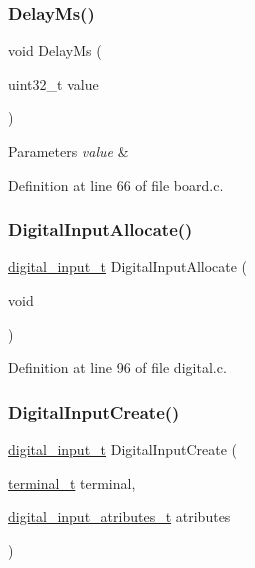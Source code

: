 \mbox{\label{group__hal_gace922d758774792e0573b7c568fe2a3f}} 
\subsubsection{\texorpdfstring{Delay\+Ms()}{DelayMs()}}
{\footnotesize\ttfamily void Delay\+Ms (\begin{DoxyParamCaption}\item[{uint32\+\_\+t}]{value }\end{DoxyParamCaption})}


\begin{DoxyParams}{Parameters}
{\em value} & \\
\hline
\end{DoxyParams}


Definition at line 66 of file board.\+c.

\mbox{\label{group__hal_gaf1b5f5495ccca4acd64ff693392702b1}} 
\subsubsection{\texorpdfstring{Digital\+Input\+Allocate()}{DigitalInputAllocate()}}
{\footnotesize\ttfamily \hyperlink{group__hal_gaa88780f43e331bbd1d6069d75ad68fcf}{digital\+\_\+input\+\_\+t} Digital\+Input\+Allocate (\begin{DoxyParamCaption}\item[{void}]{ }\end{DoxyParamCaption})}



Definition at line 96 of file digital.\+c.

\mbox{\label{group__hal_gab97f7c0af35e98c5f29ca3083b743d34}} 
\subsubsection{\texorpdfstring{Digital\+Input\+Create()}{DigitalInputCreate()}}
{\footnotesize\ttfamily \hyperlink{group__hal_gaa88780f43e331bbd1d6069d75ad68fcf}{digital\+\_\+input\+\_\+t} Digital\+Input\+Create (\begin{DoxyParamCaption}\item[{\hyperlink{group__hal_ga64d2a4cb83c256a6ace36ce64935997f}{terminal\+\_\+t}}]{terminal,  }\item[{\hyperlink{group__hal_ga425db4b2c52be0608edec9a314976335}{digital\+\_\+input\+\_\+atributes\+\_\+t}}]{atributes }\end{DoxyParamCaption})}


